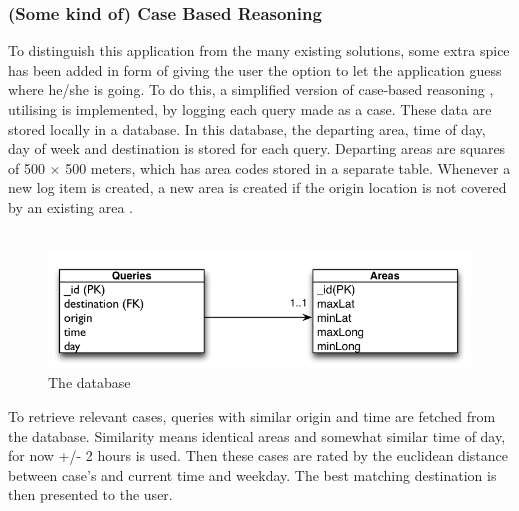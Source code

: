 \subsubsection{(Some kind of) Case Based Reasoning}
To distinguish this application from the many existing solutions, some extra spice has been added in form of giving the user the option to let the application guess where he/she is going. To do this, a simplified version of case-based reasoning \cite{aam}, utilising is implemented, by logging each query made as a case. These data are stored locally in a database. In this database, the departing area, time of day, day of week and destination is stored for each query. Departing areas are squares of 500 $\times$ 500 meters, which has area codes stored in a separate table. Whenever a new log item is created, a new area is created if the origin location is not covered by an existing area . \\\\
\begin{figure}
\includegraphics[scale=0.5]{Intelligence/database.png}
\caption{The database}
\end{figure}

To retrieve relevant cases, queries with similar origin and time are fetched from the database. Similarity means identical areas and somewhat similar time of day, for now +/- 2 hours is used. Then these cases are rated by the euclidean distance between case's and current time and weekday. The best matching destination is then presented to the user.
